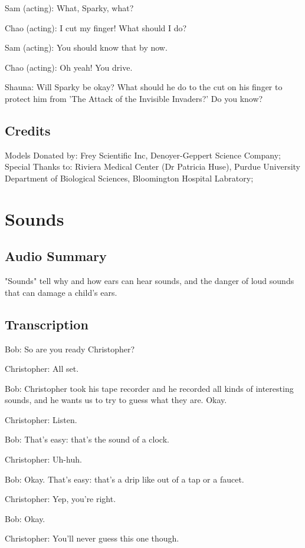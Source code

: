 Sam (acting): What, Sparky, what?

Chao (acting): I cut my finger! What should I do?

Sam (acting): You should know that by now.

Chao (acting): Oh yeah! You drive.

Shauna: Will Sparky be okay? What should he do to the cut on his finger to protect him from 'The Attack of the Invisible Invaders?' Do you know?

\subsection{Credits}

Models Donated by: Frey Scientific Inc, Denoyer-Geppert Science Company;
Special Thanks to: Riviera Medical Center (Dr Patricia Huse), Purdue University Department of Biological Sciences, Bloomington Hospital Labratory;

\section{Sounds}

\subsection{Audio Summary}

"Sounds" tell why and how ears can hear sounds, and the danger of loud sounds that can damage a child's ears.

\subsection{Transcription}

Bob: So are you ready Christopher?

Christopher: All set.

Bob: Christopher took his tape recorder and he recorded all kinds of interesting sounds, and he wants us to try to guess what they are. Okay.

Christopher: Listen.

Bob: That's easy: that's the sound of a clock.

Christopher: Uh-huh.

Bob: Okay. That's easy: that's a drip like out of a tap or a faucet.

Christopher: Yep, you're right.

Bob: Okay.

Christopher: You'll never guess this one though.

